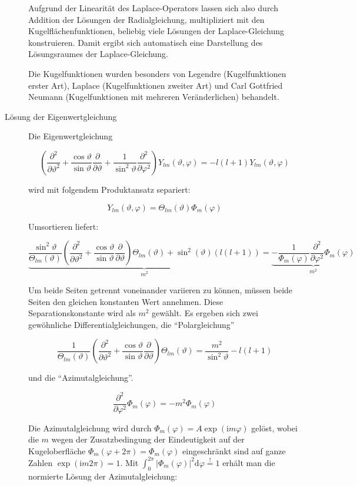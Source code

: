 \begin{definition}
\begin{description}
Aufgrund der Linearität des Laplace-Operators lassen sich also durch Addition der Lösungen der Radialgleichung, multipliziert mit den Kugelflächenfunktionen, beliebig viele Lösungen der Laplace-Gleichung konstruieren. Damit ergibt sich automatisch eine Darstellung des Lösungsraumes der Laplace-Gleichung.

Die Kugelfunktionen wurden besonders von Legendre (Kugelfunktionen erster Art), Laplace (Kugelfunktionen zweiter Art) und Carl Gottfried Neumann (Kugelfunktionen mit mehreren Veränderlichen) behandelt.

	\item[Lösung der Eigenwertgleichung]

Die Eigenwertgleichung

\[\left(\frac{\partial^{2}}{\partial\vartheta^{2}}+\frac{\cos\vartheta}{\sin\vartheta}\frac{\partial}{\partial\vartheta}+\frac{1}{\sin^{2}\vartheta}\frac{\partial^{2}}{\partial\varphi^{2}}\right)Y_{lm}(\vartheta,\varphi)=-l(l+1)Y_{lm}(\vartheta,\varphi)\]

wird mit folgendem Produktansatz separiert:

\[Y_{lm}(\vartheta,\varphi)=\Theta_{lm}(\vartheta)\Phi_{m}(\varphi)\]

Umsortieren liefert:

\[\underbrace{\frac{\sin^{2}\vartheta}{\Theta_{lm}(\vartheta)}\left(\frac{\partial^{2}}{\partial\vartheta^{2}}+\frac{\cos\vartheta}{\sin\vartheta}\frac{\partial}{\partial\vartheta}\right)\Theta_{lm}(\vartheta)+\sin^{2}(\vartheta)(l(l+1))}_{m^{2}}=\underbrace{-\frac{1}{\Phi_{m}(\varphi)}\frac{\partial^{2}}{\partial\varphi^{2}}\Phi_{m}(\varphi)}_{m^{2}}\]

Um beide Seiten getrennt voneinander variieren zu können, müssen beide Seiten den gleichen konstanten Wert annehmen. Diese Separationskonstante wird als $m^2$ gewählt. Es ergeben sich zwei gewöhnliche Differentialgleichungen, die \enquote{Polargleichung}

\[\frac{1}{\Theta_{lm}(\vartheta)}\left(\frac{\partial^{2}}{\partial\vartheta^{2}}+\frac{\cos\vartheta}{\sin\vartheta}\frac{\partial}{\partial\vartheta}\right)\Theta_{lm}(\vartheta)=\frac{m^{2}}{\sin^{2}\vartheta}-l(l+1)\]

und die \enquote{Azimutalgleichung}.

\[\frac{\partial^{2}}{\partial\varphi^{2}}\Phi_{m}(\varphi)=-m^{2}\Phi_{m}(\varphi)\]

Die Azimutalgleichung wird durch $\Phi_{m}(\varphi)=A\exp(\mathrm im\varphi)$ gelöst, wobei die $m$ wegen der Zusatzbedingung der Eindeutigkeit auf der Kugeloberfläche $\Phi_{m}(\varphi+2\pi)=\Phi_{m}(\varphi)$ eingeschränkt sind auf ganze Zahlen $\exp(\mathrm im2\pi)=1$. Mit $\int_{0}^{2\pi}|\Phi_{m}(\varphi)|^{2}\mathrm{d}\varphi\overset{!}{=}1$ erhält man die normierte Lösung der Azimutalgleichung:


\end{description}
\end{definition}
